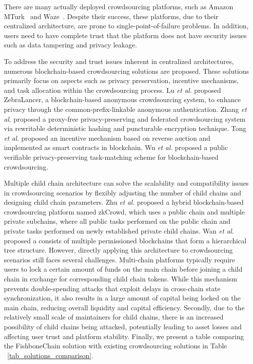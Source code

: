 \documentclass[10pt,journal]{IEEEtran}
\begin{document}
There are many actually deployed crowdsourcing platforms, such as Amazon MTurk~\cite{MechanicalTurk} and Waze~\cite{Waze}. Despite their success, these platforms, due to their centralized architecture, are prone to single-point-of-failure problems. In addition, users need to have complete trust that the platform does not have security issues such as data tampering and privacy leakage.

To address the security and trust issues inherent in centralized architectures, numerous blockchain-based crowdsourcing solutions are proposed. These solutions primarily focus on aspects such as privacy preservation\cite{lu2018zebralancer,zhang2021enabling}, incentive mechanisms\cite{tong2024privacy}, and task allocation\cite{wu2024vp} within the crowdsourcing process. Lu \textit{et al.} \cite{lu2018zebralancer} proposed ZebraLancer, a blockchain-based anonymous crowdsourcing system, to enhance privacy through the common-prefix-linkable anonymous authentication. Zhang \textit{et al.} \cite{zhang2021enabling} proposed a proxy-free privacy-preserving and federated crowdsourcing system via rewritable deterministic hashing and puncturable encryption technique. Tong \textit{et al.} \cite{tong2024privacy} proposed an incentive mechanism based on reverse auction and implemented as smart contracts in blockchain. Wu \textit{et al.} \cite{wu2024vp} proposed a public verifiable privacy-preserving task-matching scheme for blockchain-based crowdsourcing.

Multiple child chain architecture can solve the scalability and compatibility issues in crowdsourcing scenarios by flexibly adjusting the number of child chains and designing child chain parameters. Zhu \textit{et al.} \cite{zhu2019zkcrowd} proposed a hybrid blockchain-based crowdsourcing platform named zkCrowd, which uses a public chain and multiple private subchains, where all public tasks performed on the public chain and private tasks performed on newly established private child chains. Wan \textit{et al.} \cite{wan2022hibechain} proposed a consists of multiple permissioned blockchains that form a hierarchical tree structure. However, directly applying this architecture to crowdsourcing scenarios still faces several challenges. Multi-chain platforms typically require users to lock a certain amount of funds on the main chain before joining a child chain in exchange for corresponding child chain tokens. While this mechanism prevents double-spending attacks that exploit delays in cross-chain state synchronization, it also results in a large amount of capital being locked on the main chain, reducing overall liquidity and capital efficiency. Secondly, due to the relatively small scale of maintainers for child chains, there is an increased possibility of child chains being attacked, potentially leading to asset losses and affecting user trust and platform stability. Finally, we present a table comparing the FishboneChain solution with existing crowdsourcing solutions in Table ~\ref{tab_solutions_comparison}.
\end{document}
